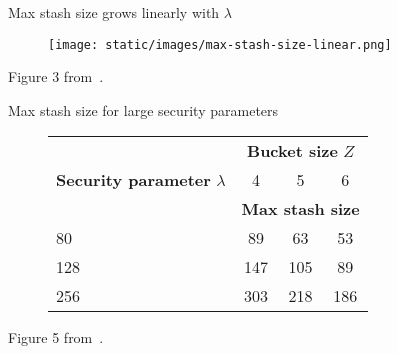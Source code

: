 
\begin{frame}{Max stash size grows linearly with $\lambda$}
	
	\begin{center}

		\begin{figure}
				
			\texttt{[image: static/images/max-stash-size-linear.png]}
				
		\end{figure}
		
	\end{center}

	Figure 3 from~\cite{DBLP:journals/corr/abs-1202-5150}.

\end{frame}

\begin{frame}{Max stash size for large security parameters}
	
	\begin{center}

		\begin{figure}

			\begin{tabular}{ l c c c }

				\toprule%

				\multirow{3}{*}{\textbf{Security parameter} $\lambda$}	& \multicolumn{3}{c}{\textbf{Bucket size} $Z$}					\\
																		& 4												& 5		& 6		\\
																		& \multicolumn{3}{c}{\textbf{Max stash size}}					\\

				\midrule%

				80														& 89											& 63	& 53	\\
				128														& 147											& 105	& 89	\\
				256														& 303											& 218	& 186	\\

				\bottomrule%

			\end{tabular}

		\end{figure}

	\end{center}

	Figure 5 from~\cite{DBLP:journals/corr/abs-1202-5150}.

\end{frame}

